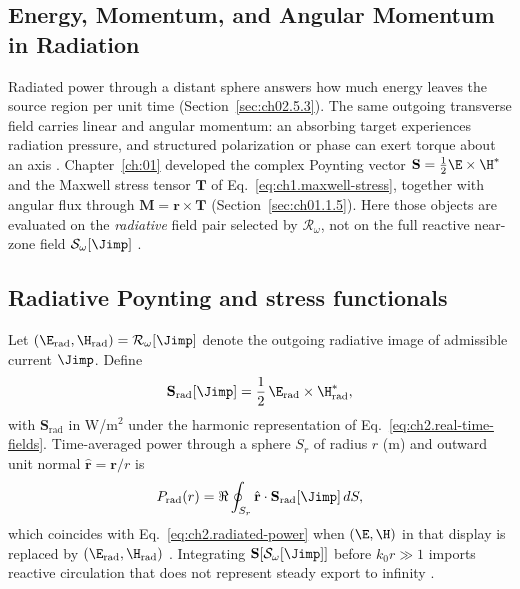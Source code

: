 
\subsection{Energy, Momentum, and Angular Momentum in Radiation}
\label{sec:ch02.5b}

Radiated power through a distant sphere answers how much energy leaves the source region per unit time (Section~\ref{sec:ch02.5.3}). The same outgoing transverse field carries linear and angular momentum: an absorbing target experiences radiation pressure, and structured polarization or phase can exert torque about an axis \cite{poynting1884,maxwell1873,stratton1941}. Chapter~\ref{ch:01} developed the complex Poynting vector $\mathbf{S}=\tfrac12\E\times\H^*$ and the Maxwell stress tensor $\mathbf{T}$ of Eq.~\eqref{eq:ch1.maxwell-stress}, together with angular flux through $\mathbf{M}=\mathbf{r}\times\mathbf{T}$ (Section~\ref{sec:ch01.1.5}). Here those objects are evaluated on the \emph{radiative} field pair selected by $\mathcal{R}_\omega$, not on the full reactive near-zone field $\mathcal{S}_\omega[\Jimp]$ \cite{stratton1941,harrington2001}.

\subsection{Radiative Poynting and stress functionals}
\label{sec:ch02.5b.1}

Let $(\E_{\mathrm{rad}},\H_{\mathrm{rad}})=\mathcal{R}_\omega[\Jimp]$ denote the outgoing radiative image of admissible current $\Jimp$. Define
\begin{equation}
\label{eq:ch2.poynting-functional-radiative}
\mathbf{S}_{\mathrm{rad}}[\Jimp]
=
\frac{1}{2}\,\E_{\mathrm{rad}}\times\H_{\mathrm{rad}}^{*},
\end{equation}
with $\mathbf{S}_{\mathrm{rad}}$ in W/m$^2$ under the harmonic representation of Eq.~\eqref{eq:ch2.real-time-fields}. Time-averaged power through a sphere $S_r$ of radius $r$ (m) and outward unit normal $\hat{\mathbf{r}}=\mathbf{r}/r$ is
\begin{equation}
\label{eq:ch2.flux-on-radiative-branch}
P_{\mathrm{rad}}(r)
=
\Re\oint_{S_r}\hat{\mathbf{r}}\cdot\mathbf{S}_{\mathrm{rad}}[\Jimp]\,dS,
\end{equation}
which coincides with Eq.~\eqref{eq:ch2.radiated-power} when $(\E,\H)$ in that display is replaced by $(\E_{\mathrm{rad}},\H_{\mathrm{rad}})$ \cite{poynting1884,stratton1941}. Integrating $\mathbf{S}[\mathcal{S}_\omega[\Jimp]]$ before $k_0 r\gg1$ imports reactive circulation that does not represent steady export to infinity \cite{harrington2001}.

